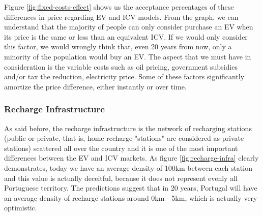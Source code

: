 Figure \ref{fig:fixed-costs-effect} shows us the acceptance percentages of these differences in price regarding EV and ICV models. From the graph, we can understand that the majority of people can only consider purchase an EV when its price is the same or less than an equivalent ICV. If we would only consider this factor, we would wrongly think that, even 20 years from now, only a minority of the population would buy an EV. The aspect that we must have in consideration is the variable costs such as oil pricing, government subsidies and/or tax the reduction, electricity price. Some of these factors significantly amortize the price difference, either instantly or over time.

\subsubsection{Recharge Infrastructure}
As said before, the recharge infrastructure is the network of recharging stations (public or private, that is, home recharge "stations" are considered as private stations) scattered all over the country and it is one of the most important differences between the EV and ICV markets. As figure \ref{fig:recharge-infra} clearly demonstrates, today we have an average density of 100km between each station and this value is actually deceitful, because it does not represent evenly all Portuguese territory. The predictions suggest that in 20 years, Portugal will have an average density of recharge stations around 0km - 5km, which is actually very optimistic.

